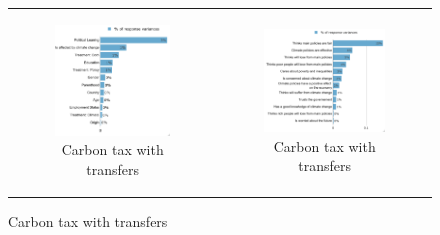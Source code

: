 \documentclass{article}
\begin{document}
\begin{figure}[h!]
\begin{center}
	\begin{tabular}{cc}
		\begin{subfigure}{0.5\textwidth}
		\caption{Carbon tax with transfers}
			\includegraphics[width=\textwidth]{lmg_tax_transfers_socio_non_standardized}
		\end{subfigure}&
		\begin{subfigure}{0.5\textwidth}
		\caption{Carbon tax with transfers}
			\includegraphics[width=\textwidth]{lmg_tax_transfers_indices_non_standardized}
		\end{subfigure}\\
	\end{tabular}
\end{center}
\end{figure}
\end{document}
